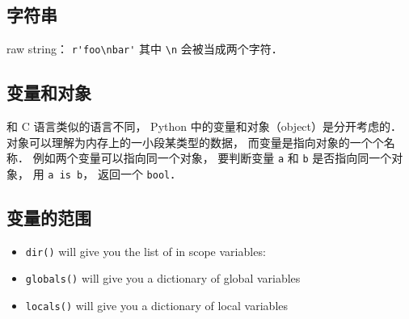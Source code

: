 \subsection{字符串}
raw string： \verb|r'foo\nbar'| 其中 \verb|\n| 会被当成两个字符．

\subsection{变量和对象}
和 C 语言类似的语言不同， Python 中的变量和对象（object）是分开考虑的． 对象可以理解为内存上的一小段某类型的数据， 而变量是指向对象的一个个名称． 例如两个变量可以指向同一个对象， 要判断变量 \verb|a| 和 \verb|b| 是否指向同一个对象， 用 \verb|a is b|， 返回一个 \verb|bool|．

\subsection{变量的范围}
\begin{itemize}
\item \verb|dir()| will give you the list of in scope variables:
\item \verb|globals()| will give you a dictionary of global variables
\item \verb|locals()| will give you a dictionary of local variables
\end{itemize}
